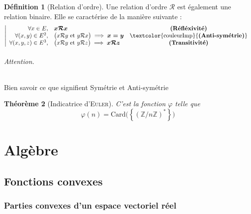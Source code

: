 \documentclass[11pt,a4paper]{report}
\newtheorem{theorem}{Théorème}[chapter]
\theoremstyle{definition}
\newtheorem{dfn}[theorem]{Définition}
\begin{document}
\begin{dfn}[Relation d'ordre]
Une relation d'ordre $\mathcal{R}$ est également une relation binaire. Elle se caractérise de la manière suivante : 
\begin{equation}
\left|
\begin{array}{r l c}
\forall x \in E,& \boldsymbol{x\mathcal{R}x} & \text{\textbf{(Réfléxivité)}}\\
\forall (x,y) \in E^2, & \big( x\mathcal{R}y \text{ et } y\mathcal{R}x \big) \implies \boldsymbol{x=y} & \text{\textcolor{couleurImp}{\textbf{(Anti-symétrie)}}}\\
\forall (x,y,z) \in E^3, & \big( x\mathcal{R}y \text{ et } y\mathcal{R}z \big) \implies \boldsymbol{x\mathcal{R}z} & \text{\textbf{(Transitivité)}}
\end{array}
\right.
\end{equation}
\end{dfn}

\paragraph{Attention.} Bien savoir ce que signifient Symétrie et Anti-symétrie


\begin{theorem}[Indicatrice d'\textsc{Euler}]
C'est la fonction $\varphi$ telle que 
\[
    \varphi (n) = \mathrm{Card}\big( \left\lbrace \left( \mathbb{Z} / n \mathbb{Z} \right) ^{*} \right\rbrace \big)
\]
\end{theorem}


\part{Algèbre}
\chapter{Fonctions convexes} %
\label{cha:fonctions_convexes}
\section{Parties convexes d'un espace vectoriel réel} %
\label{sec:parties_convexes_d_un_ev}
\end{document}
